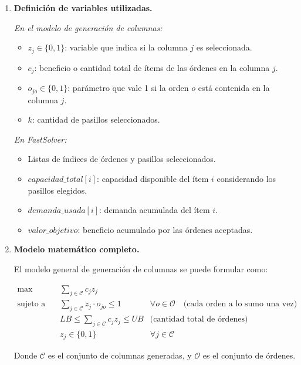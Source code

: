 \documentclass[a4paper,12pt]{article}
\begin{document}
\begin{enumerate}[label=(\alph*), leftmargin=2em]
\begin{enumerate}[label=\roman*., leftmargin=0.2em]
        \item \textbf{Definición de variables utilizadas.}

        \textit{En el modelo de generación de columnas:}
        \begin{itemize}
            \item \( z_j \in \{0,1\} \): variable que indica si la columna \(j\) es seleccionada.
            \item \( c_j \): beneficio o cantidad total de ítems de las órdenes en la columna \(j\).
            \item \( o_{jo} \in \{0,1\} \): parámetro que vale 1 si la orden \(o\) está contenida en la columna \(j\).
            \item \( k \): cantidad de pasillos seleccionados.
        \end{itemize}

        \textit{En FastSolver:}
        \begin{itemize}
            \item Listas de índices de órdenes y pasillos seleccionados.
            \item \( capacidad\_total[i] \): capacidad disponible del ítem \(i\) considerando los pasillos elegidos.
            \item \( demanda\_usada[i] \): demanda acumulada del ítem \(i\).
            \item \( valor\_objetivo \): beneficio acumulado por las órdenes aceptadas.
        \end{itemize}

        \item \textbf{Modelo matemático completo.}

        El modelo general de generación de columnas se puede formular como:

        \[
        \begin{aligned}
        \max \quad & \sum_{j \in \mathcal{C}} c_j z_j \\
        \text{sujeto a} \quad
        & \sum_{j \in \mathcal{C}} z_j \cdot o_{jo} \leq 1 & \forall o \in \mathcal{O} \quad \text{(cada orden a lo sumo una vez)} \\
        & LB \leq \sum_{j \in \mathcal{C}} c_j z_j \leq UB & \text{(cantidad total de órdenes)} \\
        & z_j \in \{0,1\} & \forall j \in \mathcal{C}
        \end{aligned}
        \]

        Donde \( \mathcal{C} \) es el conjunto de columnas generadas, y \( \mathcal{O} \) es el conjunto de órdenes.


\end{enumerate}
\end{enumerate}
\end{document}
